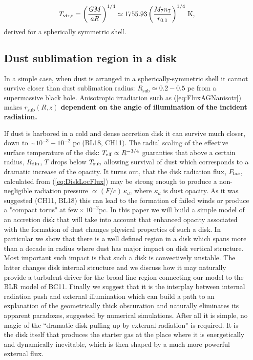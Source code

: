 \documentclass[12pt,english,preprint]{aastex}
\newcommand{\mybf}{\bf}
\begin{document}
\begin{equation}
T_{{\rm vir,r}}=\left(\frac{GM}{a R}\right)^{1/4}\simeq1755.93\left(\frac{M_{7}n_{7}}{r_{0.1}}\right)^{1/4}{\rm \,K}\mbox{,}\label{eq:TvirRad}
\end{equation}
derived for a spherically symmetric shell.


\subsection{Dust sublimation region in a disk}\label{sec:DustSubRegIndisk}

In a simple case, when dust is arranged in a spherically-symmetric
shell it cannot survive closer than dust sublimation radius: $R_{\text{sub}}\simeq0.2-0.5$
pc from a supermassive black hole. Anisotropic irradiation such as
(\ref{eq:FluxAGNanisotr}) makes $r_{\text{sub}}(R,z)$
{\mybf dependent on the angle of illumination of the incident radiation.}

If dust is harbored in a cold and dense accretion disk it can survive
much closer, down to $\sim10^{-3}-10^{-2}$ pc (BL18, CH11). The radial
scaling of the effective surface temperature of the disk: $T_{{\rm eff}}\propto R^{-3/4}$
guaranties that above a certain radius, $R_{{\rm din}}$, $T$ drops
below $T_{{\rm sub}}$ 
allowing survival of dust which corresponds
to a dramatic increase of the opacity. It turns out, that the disk
radiation flux, $F_{{\rm loc}}$, calculated from (\ref{eq:DiskLocFlux})
may be strong enough to produce a non-negligible radiation pressure
$\propto(F/c)\,\kappa_{d}$, where $\kappa_{d}$ is dust opacity.
As it was suggested (CH11, BL18) this can lead to the formation of failed
winds or produce a "compact torus" at $\text{few}\times10^{-2}$pc.
In this paper we will build a simple model of an accretion disk that
will take into account that enhanced opacity associated with the formation
of dust changes physical properties of such a disk. In particular
we show that there is a well defined region in a disk which spans
more than a decade in radius where dust has major impact on disk vertical
structure. Most important such impact is that such a disk is convectively
unstable. The latter changes disk internal structure and we discuss
how it may naturally provide a turbulent driver for the broad line
region connecting our model to the BLR model of BC11. Finally we suggest
that it is the interplay between internal radiation push and external
illumination which can build a path to an explanation of the geometrically
thick obscuration and naturally eliminates its apparent paradoxes,
suggested by numerical simulations. After all it is simple, no magic
of the ``dramatic disk puffing up by external radiation'' is required.
It is the disk itself that produces the starter gas at the place where
it is energetically and dynamically inevitable, which is then shaped
by a much more powerful external flux.
\end{document}

